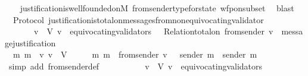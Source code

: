 \begin{isabellebody}
%
\isadelimproof
\ \ %
\endisadelimproof
%
\isatagproof
{}\isamarkupfalse%
\ justification{\isacharunderscore}is{\isacharunderscore}well{\isacharunderscore}founded{\isacharunderscore}on{\isacharunderscore}M\ from{\isacharunderscore}sender{\isacharunderscore}type{\isacharunderscore}for{\isacharunderscore}state\ wfp{\isacharunderscore}on{\isacharunderscore}subset\ \isamarkupfalse%
\ blast%
\endisatagproof
{\isafoldproof}%
%
\isadelimproof
\ \isanewline
%
\endisadelimproof
\isanewline
{}\isamarkupfalse%
\ {\isacharparenleft}\ Protocol{\isacharparenright}\ justification{\isacharunderscore}is{\isacharunderscore}total{\isacharunderscore}on{\isacharunderscore}messages{\isacharunderscore}from{\isacharunderscore}non{\isacharunderscore}equivocating{\isacharunderscore}validator{\isacharcolon}\isanewline
\ \ {\isachardoublequoteopen}{\isasymforall}\ {\isasymsigma}\ {\isasymin}\ {\isasymSigma}{\isachardot}\ {\isacharparenleft}{\isasymforall}\ v\ {\isasymin}\ V{\isachardot}\ v\ {\isasymnotin}\ equivocating{\isacharunderscore}validators\ {\isasymsigma}\ {\isasymlongrightarrow}\ Relation{\isachardot}total{\isacharunderscore}on\ {\isacharparenleft}from{\isacharunderscore}sender\ {\isacharparenleft}v{\isacharcomma}\ {\isasymsigma}{\isacharparenright}{\isacharparenright}\ message{\isacharunderscore}justification{\isacharparenright}{\isachardoublequoteclose}\isanewline
%
\isadelimproof
%
\endisadelimproof
%
\isatagproof
{}\isamarkupfalse%
\ {\isacharminus}\isanewline
\ \ \isamarkupfalse%
\ {\isachardoublequoteopen}{\isasymforall}\ m{}\ m{}\ {\isasymsigma}\ v{\isachardot}\ v\ {\isasymin}\ V\ {\isasymand}\ {\isasymsigma}\ {\isasymin}\ {\isasymSigma}\ {\isasymand}\ {\isacharbraceleft}m{}{\isacharcomma}\ m{}{\isacharbraceright}\ {\isasymsubseteq}\ from{\isacharunderscore}sender\ {\isacharparenleft}v{\isacharcomma}\ {\isasymsigma}{\isacharparenright}\ {\isasymlongrightarrow}\ sender\ m{}\ {\isacharequal}\ sender\ m{}\ {\isachardoublequoteclose}\isanewline
\ \ \ \ \isamarkupfalse%
\ {\isacharparenleft}simp\ add{\isacharcolon}\ from{\isacharunderscore}sender{\isacharunderscore}def{\isacharparenright}\isanewline
\ \ \isamarkupfalse%
\ \isamarkupfalse%
\ {\isachardoublequoteopen}{\isasymforall}\ {\isasymsigma}\ {\isasymin}\ {\isasymSigma}{\isachardot}\ {\isacharparenleft}{\isasymforall}\ v\ {\isasymin}\ V{\isachardot}\ v\ {\isasymnotin}\ equivocating{\isacharunderscore}validators\ {\isasymsigma}\ \isanewline

\end{isabellebody}
